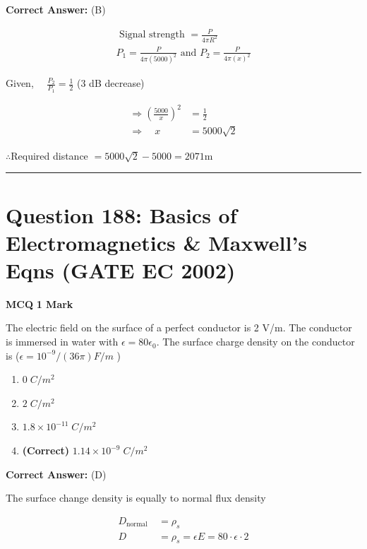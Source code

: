 \documentclass[11pt,a4paper]{article}
\begin{document}
\noindent \textbf{Correct Answer:} (B)

\begin{tcolorbox}[solbox, title=Detailed Solution -- Question 187]
\[
\begin{array}{l} \text { Signal strength }=\frac{P}{4 \pi R^{2}} \\ P_{1}=\frac{P}{4 \pi(5000)^{2}} \text { and } P_{2}=\frac{P}{4 \pi(x)^{2}} \end{array}
\]

 Given, $\quad \frac{P_{2}}{P_{1}}=\frac{1}{2}$ (3 dB decrease)

\[
\begin{aligned} \Rightarrow\left(\frac{5000}{x}\right)^{2}&=\frac{1}{2} \\ \Rightarrow \quad x&=5000 \sqrt{2} \end{aligned}
\]

$\therefore$Required distance
$=5000 \sqrt{2}-5000=2071 \mathrm{m}$
\end{tcolorbox}

\vspace{1.5em}
\hrule
\vspace{1.5em}

\section*{Question 188: Basics of Electromagnetics \& Maxwell's Eqns (GATE EC 2002)}
\noindent \textbf{\color{primary}MCQ} \hfill \textbf{\color{secondary}1 Mark}


\noindent The electric field on the surface of a perfect conductor is 2 V/m. The conductor is
immersed in water with $\epsilon =80\epsilon_{0}$. The surface charge density on the conductor is ($\epsilon =10^{-9}/(36\pi)F/m$ )


\begin{enumerate}[label=(\Alph*)]
    \item $0 \; C/m^{2}$
    \item $2 \; C/m^{2}$
    \item $1.8 \times 10^{-11} \; C/m^{2}$
    \item \textbf{(Correct)} $1.14 \times 10^{-9} \; C/m^{2}$
\end{enumerate}

\noindent \textbf{Correct Answer:} (D)

\begin{tcolorbox}[solbox, title=Detailed Solution -- Question 188]
The surface change density is equally to normal
 flux density 

\[
\begin{aligned} D_{\text {normal }} &=\rho_{s} \\ D &=\rho_{s}=\epsilon E=80 \cdot \epsilon \cdot 2 \end{aligned}
\]
\end{tcolorbox}
\end{document}

